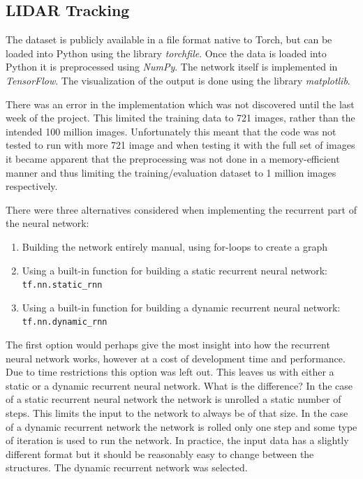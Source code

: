 \documentclass[a4paper]{article}
\begin{document}
\subsection{LIDAR Tracking}

The dataset is publicly available in a file format native to Torch, but can be loaded into Python using the library \emph{torchfile}.
Once the data is loaded into Python it is preprocessed using \emph{NumPy}.
The network itself is implemented in \emph{TensorFlow}.
The visualization of the output is done using the library \emph{matplotlib}.

There was an error in the implementation which was not discovered until the last week of the project.
This limited the training data to 721 images, rather than the intended 100 million images.
Unfortunately this meant that the code was not tested to run with more 721 image and when testing it with the full set of images it became apparent that the preprocessing was not done in a memory-efficient manner and thus limiting the training/evaluation dataset to 1 million images respectively.

There were three alternatives considered when implementing the recurrent part of the neural network:

\begin{enumerate}
	\item Building the network entirely manual, using for-loops to create a graph
	\item Using a built-in function for building a static recurrent neural network: \texttt{tf.nn.static\_rnn}
	\item Using a built-in function for building a dynamic recurrent neural network: \texttt{tf.nn.dynamic\_rnn}
\end{enumerate}

The first option would perhaps give the most insight into how the recurrent neural network works, however at a cost of development time and performance.
Due to time restrictions this option was left out.
This leaves us with either a static or a dynamic recurrent neural network.
What is the difference?
In the case of a static recurrent neural network the network is unrolled a static number of steps.
This limits the input to the network to always be of that size.
In the case of a dynamic recurrent network the network is rolled only one step and some type of iteration is used to run the network.
In practice, the input data has a slightly different format but it should be reasonably easy to change between the structures.
The dynamic recurrent network was selected.
\end{document}
